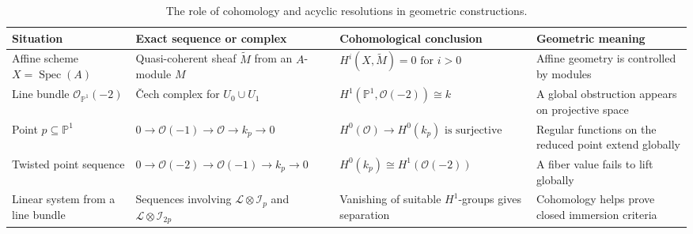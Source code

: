 \documentclass[12pt,a4paper]{article}
\theoremstyle{notespace}
\begin{document}
\begin{table}[htbp]
	\centering
	\renewcommand{\arraystretch}{1.45}
	\begin{adjustbox}{max width=\textwidth}
		\begin{tabular}{
				|>{\raggedright\arraybackslash}p{4.2cm}
				|>{\raggedright\arraybackslash}p{5.3cm}
				|>{\raggedright\arraybackslash}p{5.0cm}
				|>{\raggedright\arraybackslash}p{5.3cm}|
			}
			\hline
			\textbf{Situation}
			&
			\textbf{Exact sequence or complex}
			&
			\textbf{Cohomological conclusion}
			&
			\textbf{Geometric meaning}
			\\
			\hline
			
			Affine scheme
			\(\displaystyle X=\operatorname{Spec}(A)\)
			&
			Quasi-coherent sheaf
			\(\displaystyle \widetilde{M}\)
			from an \(A\)-module \(M\)
			&
			\(\displaystyle
			H^{i}(X,\widetilde{M})=0
			\text{ for }i>0
			\)
			&
			Affine geometry is controlled by modules
			\\
			\hline
			
			Line bundle
			\(\displaystyle \mathcal{O}_{\mathbb{P}^{1}}(-2)\)
			&
			Čech complex for
			\(\displaystyle U_{0}\cup U_{1}\)
			&
			\(\displaystyle
			H^{1}(\mathbb{P}^{1},\mathcal{O}(-2))
			\cong k
			\)
			&
			A global obstruction appears on projective space
			\\
			\hline
			
			Point
			\(\displaystyle p\subseteq \mathbb{P}^{1}\)
			&
			\(\displaystyle
			0\to\mathcal{O}(-1)
			\to\mathcal{O}
			\to k_{p}
			\to 0
			\)
			&
			\(\displaystyle
			H^{0}(\mathcal{O})
			\to H^{0}(k_{p})
			\text{ is surjective}
			\)
			&
			Regular functions on the reduced point extend globally
			\\
			\hline
			
			Twisted point sequence
			&
			\(\displaystyle
			0\to\mathcal{O}(-2)
			\to\mathcal{O}(-1)
			\to k_{p}
			\to 0
			\)
			&
			\(\displaystyle
			H^{0}(k_{p})
			\cong
			H^{1}(\mathcal{O}(-2))
			\)
			&
			A fiber value fails to lift globally
			\\
			\hline
			
			Linear system from a line bundle
			&
			Sequences involving
			\(\displaystyle
			\mathcal{L}\otimes\mathcal{I}_{p}
			\)
			and
			\(\displaystyle
			\mathcal{L}\otimes\mathcal{I}_{2p}
			\)
			&
			Vanishing of suitable \(H^{1}\)-groups gives separation
			&
			Cohomology helps prove closed immersion criteria
			\\
			\hline
		\end{tabular}
	\end{adjustbox}
	\caption{The role of cohomology and acyclic resolutions in geometric constructions.}
	\label{tab:cohomology-acyclic-resolutions}
\end{table}
\end{document}
